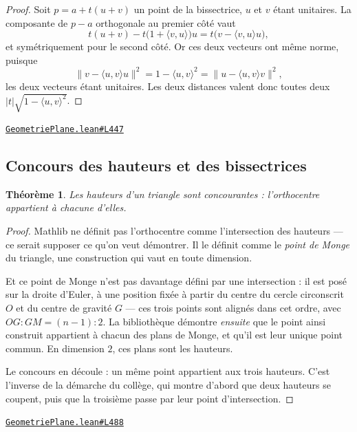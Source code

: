 \documentclass[11pt,a4paper]{article}
\theoremstyle{definition}
\theoremstyle{plain}
\newtheorem{theoreme}{Théorème}
\newcommand{\source}[2]{\par\smallskip\noindent\hfill{\footnotesize\href{#1}{\texttt{#2}}}\par\smallskip}
\begin{document}
\begin{proof}
Soit $p = a + t(u + v)$ un point de la bissectrice, $u$ et $v$ étant unitaires. La
composante de $p - a$ orthogonale au premier côté vaut
\[ t(u+v) - t\bigl(1 + \langle v, u\rangle\bigr)u = t\bigl(v - \langle v, u\rangle u\bigr) , \]
et symétriquement pour le second côté. Or ces deux vecteurs ont même norme, puisque
\[ \|v - \langle u,v\rangle u\|^2 = 1 - \langle u,v\rangle^2
   = \|u - \langle u,v\rangle v\|^2 , \]
les deux vecteurs étant unitaires. Les deux distances valent donc toutes deux
$|t|\sqrt{1 - \langle u,v\rangle^2}$.
\end{proof}
\source{https://github.com/Commutator-IO/learn-lean/blob/main/courses/01-college/02-geometrie-plane/GeometriePlane.lean\#L447}{GeometriePlane.lean\#L447}

\subsection{Concours des hauteurs et des bissectrices}

\begin{theoreme}
Les hauteurs d'un triangle sont concourantes : l'orthocentre appartient à chacune
d'elles.
\end{theoreme}

\begin{proof}
Mathlib ne définit pas l'orthocentre comme l'intersection des hauteurs — ce serait supposer
ce qu'on veut démontrer. Il le définit comme le \emph{point de Monge} du triangle, une
construction qui vaut en toute dimension.

Et ce point de Monge n'est pas davantage défini par une intersection : il est posé sur la
droite d'Euler, à une position fixée à partir du centre du cercle circonscrit $O$ et du
centre de gravité $G$ — ces trois points sont alignés dans cet ordre, avec
$OG : GM = (n-1) : 2$. La bibliothèque démontre \emph{ensuite} que le point ainsi construit
appartient à chacun des plans de Monge, et qu'il est leur unique point commun. En dimension
$2$, ces plans sont les hauteurs.

Le concours en découle : un même point appartient aux trois hauteurs. C'est l'inverse de la
démarche du collège, qui montre d'abord que deux hauteurs se coupent, puis que la troisième
passe par leur point d'intersection.
\end{proof}
\source{https://github.com/Commutator-IO/learn-lean/blob/main/courses/01-college/02-geometrie-plane/GeometriePlane.lean\#L488}{GeometriePlane.lean\#L488}
\end{document}

